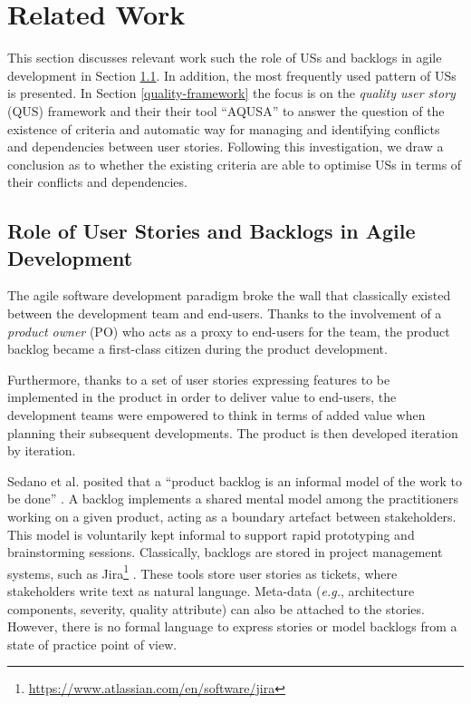 \section{Related Work}\label{related-work}
This section discusses relevant work such the role of USs and backlogs in agile development in Section \ref{us}. In addition, the most frequently used pattern of USs is presented. In Section \ref{quality-framework} the focus is on the \emph{quality user story} (QUS) framework and their their tool \enquote{AQUSA} to answer the question of the existence of criteria and automatic way for managing and identifying conflicts and dependencies between user stories. Following this investigation, we draw a conclusion as to whether the existing criteria are able to optimise USs in terms of their conflicts and dependencies.

\subsection{Role of User Stories and Backlogs in Agile Development}\label{us}
The agile software development paradigm broke the wall that classically existed between the development team and end-users. Thanks to the involvement of a \emph{product owner} (PO) who acts as a proxy to end-users for the team, the product backlog \cite{sedano2019product} became a first-class citizen during the product development. 

Furthermore, thanks to a set of user stories expressing features to be implemented in the product in order to deliver value to end-users, the development teams were empowered to think in terms of added value when planning their subsequent developments. The product is then developed iteration by iteration. 

Sedano et al. posited that a \enquote{product backlog is an informal model of the work to be done} \cite{sedano2019product}. A backlog implements a shared mental model among the practitioners working on a given product, acting as a boundary artefact between stakeholders. This model is voluntarily kept informal to support rapid prototyping and brainstorming sessions. Classically, backlogs are stored in project management systems, such as Jira\footnote{\href{https://www.atlassian.com/en/software/jira}{https://www.atlassian.com/en/software/jira}} . These tools store user stories as tickets, where stakeholders write text as natural language. Meta-data (\emph{e.g.}, architecture components, severity, quality attribute) can also be attached to the stories. However, there is no formal language to express stories or model backlogs from a state of practice point of view.

